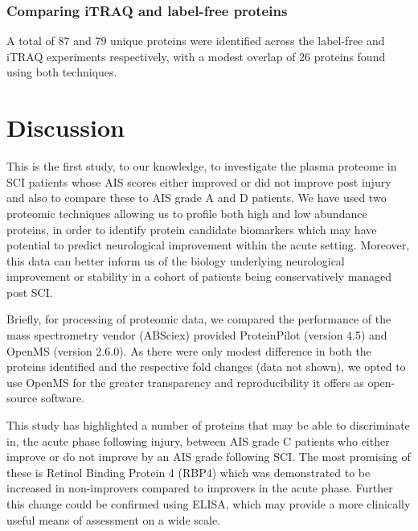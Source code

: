 \documentclass[9pt,lineno]{elife}
\begin{document}
\begin{landscape}
\begin{landscape}
{\subsubsection{Comparing iTRAQ and label-free proteins}\label{comparing-itraq-and-label-free-proteins}}

A total of 87 and 79 unique proteins were identified across the label-free and iTRAQ experiments respectively, with a modest overlap of 26 proteins found using both techniques.



\hypertarget{discussion}{%
\section{Discussion}\label{discussion}}

This is the first study, to our knowledge, to investigate the plasma proteome in SCI patients whose AIS scores either improved or did not improve post injury and also to compare these to AIS grade A and D patients.
We have used two proteomic techniques allowing us to profile both high and low abundance proteins, in order to identify protein candidate biomarkers which may have potential to predict neurological improvement within the acute setting.
Moreover, this data can better inform us of the biology underlying neurological improvement or stability in a cohort of patients being conservatively managed post SCI.

Briefly, for processing of proteomic data, we compared the performance of the mass spectrometry vendor (ABSciex) provided ProteinPilot (version 4.5) and OpenMS (version 2.6.0).
As there were only modest difference in both the proteins identified and the respective fold changes (data not shown), we opted to use OpenMS for the greater transparency and reproducibility it offers as open-source software.

This study has highlighted a number of proteins that may be able to discriminate in, the acute phase following injury, between AIS grade C patients who either improve or do not improve by an AIS grade following SCI.
The most promising of these is Retinol Binding Protein 4 (RBP4) which was demonstrated to be increased in non-improvers compared to improvers in the acute phase.
Further this change could be confirmed using ELISA, which may provide a more clinically useful means of assessment on a wide scale.


\end{landscape}
\end{landscape}
\end{document}
